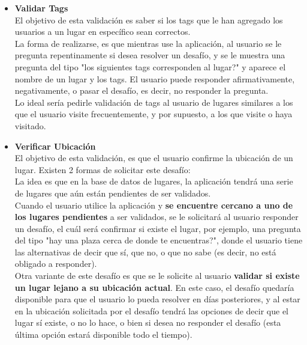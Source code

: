 \documentclass[10pt,letterpaper]{article}
\begin{document}
\begin{itemize}
 \item \textbf{Validar Tags} \\

El objetivo de esta validación es saber si los tags que le han agregado los usuarios a un lugar en específico sean correctos.\\

La forma de realizarse, es que mientras use la aplicación, al usuario se le pregunta repentinamente si desea resolver un desafío, y se le muestra una pregunta del tipo "los siguientes tags corresponden al lugar?" y aparece el nombre de un lugar y los tags. El usuario puede responder afirmativamente, negativamente, o pasar el desafío, es decir, no responder la pregunta.\\

Lo ideal sería pedirle validación de tags al usuario de lugares similares a los que el usuario visite frecuentemente, y por supuesto, a los que visite o haya visitado.\\

 \item \textbf{Verificar Ubicación} \\

El objetivo de esta validación, es que el usuario confirme la ubicación de un lugar. Existen 2 formas de solicitar este desafío:\\

La idea es que en la base de datos de lugares, la aplicación tendrá una serie de lugares que aún están pendientes de ser validados.\\

Cuando el usuario utilice la aplicación y \textbf{se encuentre cercano a uno de los lugares pendientes} a ser validados, se le solicitará al usuario responder un desafío, el cuál será confirmar si existe el lugar, por ejemplo, una pregunta del tipo "hay una plaza cerca de donde te encuentras?", donde el usuario tiene las alternativas de decir que sí, que no, o que no sabe (es decir, no está obligado a responder).\\

Otra variante de este desafío es que se le solicite al usuario \textbf{validar si existe un lugar lejano a su ubicación actual}. En este caso, el desafío quedaría disponible para que el usuario lo pueda resolver en días posteriores, y al estar en la ubicación solicitada por el desafío tendrá las opciones de decir que el lugar sí existe, o no lo hace, o bien si desea no responder el desafío (esta última opción estará disponible todo el tiempo).\\


\end{itemize}
\end{document}
